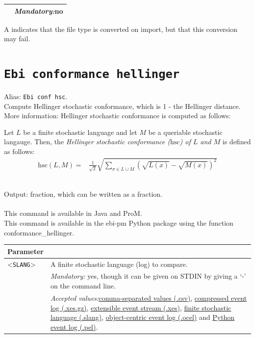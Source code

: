 {\begin{tabularx}{\linewidth}{lX}
&\textit{Mandatory:}\quad no\\
\bottomrule
\end{tabularx}
A \textdagger{} indicates that the file type is converted on import, but that this conversion may fail.
\clearpage\section{\texttt{Ebi conformance hellinger}}
\label{command:Ebi conformance hellinger}
Alias: \texttt{Ebi conf hsc}.\\
Compute Hellinger stochastic conformance, which is 1 - the Hellinger distance.\\
More information: Hellinger stochastic conformance is computed as follows:
        
        \begin{definition}
            \label{def:hsc}
                Let $L$ be a finite stochastic language and let $M$ be a queriable stochastic langauge.
                Then, the \emph{Hellinger stochastic conformance ($\text{hsc}$) of $L$ and $M$} is defined as follows: 
                \begin{align*}
                    \text{hsc}(L, M) ={}& \frac{1}{\sqrt{2}}\sqrt{\sum_{\sigma \in L \cup M}(\sqrt{L(x)}-\sqrt{M(x)})^2}
                \end{align*}       
            \end{definition}~\\
\noindent Output: fraction, which can be written as a fraction.\\
\\This command is available in Java and ProM.
\\This command is available in the ebi-pm Python package using the function conformance\_hellinger.
\begin{tabularx}{\linewidth}{lX}
\toprule
Parameter \\\midrule
<\texttt{SLANG}>&A finite stochastic language (log) to compare.\\
&\textit{Mandatory:} \quad yes, though it can be given on STDIN by giving a `-' on the command line.\\
&\textit{Accepted values:}\quad \hyperref[filehandler:comma-separated values]{comma-separated values (.csv)}, \hyperref[filehandler:compressed event log]{compressed event log (.xes.gz)}, \hyperref[filehandler:extensible event stream]{extensible event stream (.xes)}, \hyperref[filehandler:finite stochastic language]{finite stochastic language (.slang)}, \hyperref[filehandler:object-centric event log]{object-centric event log (.ocel)} and \hyperref[filehandler:Python event log]{Python event log (.pel)}.\\

\end{tabularx}}
